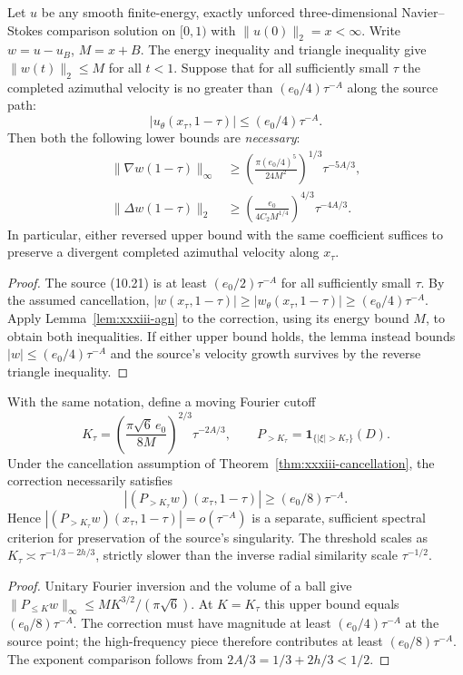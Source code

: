 \begin{theorem}
\label{thm:xxxiii-cancellation}
Let $u$ be any smooth finite-energy, exactly unforced
three-dimensional Navier--Stokes comparison solution on
$[0,1)$ with $\|u(0)\|_2=x<\infty$.
Write $w=u-u_B$, $M=x+B$. The energy inequality and
triangle inequality give $\|w(t)\|_2\le M$ for all $t<1$.
Suppose that for all sufficiently small $\tau$ the
completed azimuthal velocity is no greater than
$(e_0/4)\tau^{-A}$ along the source path:
\[
|u_\theta(x_\tau,1-\tau)|\le
(e_0/4)\tau^{-A}.
\]
Then both the following lower bounds are \emph{necessary}:
\begin{align}
\|\nabla w(1-\tau)\|_\infty
&\ge\left(\frac{\pi(e_0/4)^5}{24M^2}\right)^{1/3}
\tau^{-5A/3},
\label{eq:xxxiii-gradient-cost}\\
\|\Delta w(1-\tau)\|_2
&\ge\left(\frac{e_0}{4C_2M^{1/4}}\right)^{4/3}
\tau^{-4A/3}.
\label{eq:xxxiii-h2-cost}
\end{align}
In particular, either reversed upper bound with the
same coefficient suffices to preserve a divergent
completed azimuthal velocity along $x_\tau$.
\end{theorem}
\begin{proof}
The source (10.21) is at least $(e_0/2)\tau^{-A}$
for all sufficiently small $\tau$. By the assumed
cancellation, $|w(x_\tau,1-\tau)|\ge
|w_\theta(x_\tau,1-\tau)|\ge(e_0/4)\tau^{-A}$.
Apply Lemma~\ref{lem:xxxiii-agn} to the correction,
using its energy bound $M$, to obtain both inequalities.
If either upper bound holds, the lemma instead bounds
$|w|\le(e_0/4)\tau^{-A}$ and the source's velocity
growth survives by the reverse triangle inequality.
\end{proof}

\begin{theorem}
\label{thm:xxxiii-tail}
With the same notation, define a moving Fourier cutoff
\[
K_\tau=\left(\frac{\pi\sqrt6\,e_0}{8M}\right)^{2/3}
\tau^{-2A/3},\qquad
P_{>K_\tau}=\mathbf 1_{\{|\xi|>K_\tau\}}(D).
\]
Under the cancellation assumption of
Theorem~\ref{thm:xxxiii-cancellation}, the correction
necessarily satisfies
\[
\boxed{\quad
|(P_{>K_\tau}w)(x_\tau,1-\tau)|
\ge(e_0/8)\tau^{-A}.\quad}
\]
Hence $|(P_{>K_\tau}w)(x_\tau,1-\tau)|=o(\tau^{-A})$
is a separate, sufficient spectral criterion for
preservation of the source's singularity.
The threshold scales as
$K_\tau\asymp\tau^{-1/3-2h/3}$, strictly slower
than the inverse radial similarity scale $\tau^{-1/2}$.
\end{theorem}
\begin{proof}
Unitary Fourier inversion and the volume of a ball give
$\|P_{\le K}w\|_\infty\le
MK^{3/2}/(\pi\sqrt6)$.
At $K=K_\tau$ this upper bound equals
$(e_0/8)\tau^{-A}$. The correction must have magnitude
at least $(e_0/4)\tau^{-A}$ at the source point;
the high-frequency piece therefore contributes at least
$(e_0/8)\tau^{-A}$. The exponent comparison follows
from $2A/3=1/3+2h/3<1/2$.
\end{proof}

